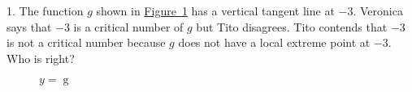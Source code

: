 \documentclass[12pt,]{book}
\theoremstyle{plain}
\theoremstyle{definition}
\numberwithin{equation}{section}
\providecommand\phantomsection{}
\newcommand{\fe}[2]{\mathop{{#1}{\left(#2\right)}}}
\begin{document}
\begin{exerciselist}
\item[1.]\phantomsection\hypertarget{exercise-394}{\null}The function \(g\) shown in \hyperref[figure-vertical-moment]{Figure~\ref*{figure-vertical-moment}} has a vertical tangent line at \(-3\).  Veronica says that \(-3\) is a critical number of \(g\) but Tito disagrees. Tito contends that \(-3\) is not a critical number because \(g\) does not have a local extreme point at \(-3\).  Who is right?%
\begin{figure}
\centering
{
}
\caption{\(y=\fe{g}{x}\)\label{figure-vertical-moment}}
\end{figure}
\par\smallskip
\end{exerciselist}
\end{document}
